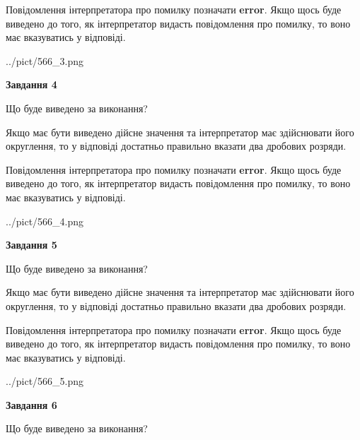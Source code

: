 \documentclass[12pt, ukrainian]{article}
\begin{document}
{\begin {Large}
Повідомлення інтерпретатора про помилку позначати \textbf{error}.
Якщо щось буде виведено до того, як інтерпретатор видасть повідомлення про помилку, 
то воно має вказуватись у відповіді. \par

\begin{center}
	{../pict/566_3.png}
\end{center}
\newpage

{\begin {center}\textbf{Завдання 4}\end {center}}\par
Що буде виведено за виконання? \par

Якщо має бути виведено дійсне значення та інтерпретатор має здійснювати його округлення, 
то у відповіді достатньо правильно вказати два дробових розряди.

Повідомлення інтерпретатора про помилку позначати \textbf{error}.
Якщо щось буде виведено до того, як інтерпретатор видасть повідомлення про помилку, 
то воно має вказуватись у відповіді. \par

\begin{center}
	{../pict/566_4.png}
\end{center}
\newpage

{\begin {center}\textbf{Завдання 5}\end {center}}\par
Що буде виведено за виконання? \par

Якщо має бути виведено дійсне значення та інтерпретатор має здійснювати його округлення, 
то у відповіді достатньо правильно вказати два дробових розряди.

Повідомлення інтерпретатора про помилку позначати \textbf{error}.
Якщо щось буде виведено до того, як інтерпретатор видасть повідомлення про помилку, 
то воно має вказуватись у відповіді. \par

\begin{center}
	{../pict/566_5.png}
\end{center}
\newpage

{\begin {center}\textbf{Завдання 6}\end {center}}\par
Що буде виведено за виконання? \par


\end{Large}}
\end{document}
